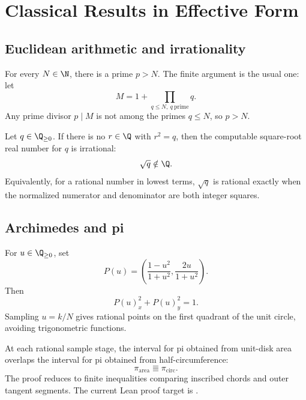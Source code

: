 \chapter{Classical Results in Effective Form}

\section{Euclidean arithmetic and irrationality}

\begin{theorem}\label{thm:euclid-primes}
For every \(N\in\N\), there is a prime \(p>N\).  The finite argument is the
usual one: let
\[
  M=1+\prod_{q\le N,\ q\ \mathrm{prime}} q.
\]
Any prime divisor \(p\mid M\) is not among the primes \(q\le N\), so \(p>N\).
\end{theorem}

\begin{theorem}
\label{thm:sqrt-irrational}
Let \(q\in\Q_{\ge 0}\).  If there is no \(r\in\Q\) with \(r^2=q\), then the
computable square-root real number for \(q\) is irrational:
\[
  \sqrt q\notin\Q.
\]
Equivalently, for a rational number in lowest terms, \(\sqrt q\) is rational
exactly when the normalized numerator and denominator are both integer
squares.
\end{theorem}

\section{Archimedes and pi}

\begin{definition}\label{def:pythagorean-samples}
For \(u\in\Q_{\ge 0}\), set
\[
  P(u)=
  \left(
    \frac{1-u^2}{1+u^2},
    \frac{2u}{1+u^2}
  \right).
\]
Then
\[
  P(u)_x^2+P(u)_y^2=1.
\]
Sampling \(u=k/N\) gives rational points on the first quadrant of the unit
circle, avoiding trigonometric functions.
\end{definition}

\begin{theorem}\label{thm:finite-archimedes}
At each rational sample stage, the interval for pi obtained from unit-disk
area overlaps the interval for pi obtained from half-circumference:
\[
  \pi_{\mathrm{area}}\Equiv \pi_{\mathrm{circ}}.
\]
The proof reduces to finite inequalities comparing inscribed chords and
outer tangent segments.  The current Lean proof target is
.
\end{theorem}

